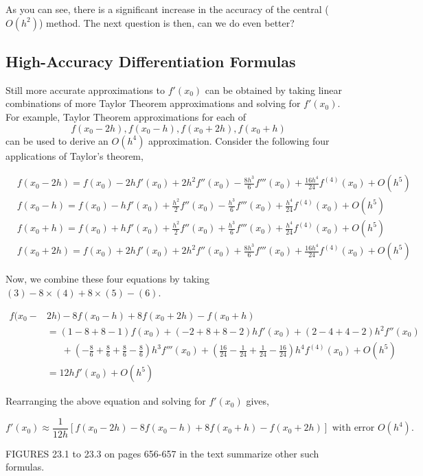 \documentclass [titlepage,12pt,letter] {article}
\begin{document}
As you can see, there is a significant increase in the accuracy of the central ($O(h^2)$) method. The next question is then, can we do even better?

\subsection{High-Accuracy Differentiation Formulas}

Still more accurate approximations to $f'(x_0)$ can be obtained by taking linear combinations of more Taylor Theorem approximations and solving for $f'(x_0)$.  For example, Taylor Theorem approximations for each of
\[
f(x_0-2h),f(x_0-h),f(x_0+2h),f(x_0+h)
\]
can be used to derive an $O(h^4)$ approximation. Consider the following four applications of Taylor's theorem,

\begin{align}
&f(x_0-2h)=f(x_0)-2hf'(x_0)+2h^2f''(x_0)-\frac{8h^3}{6}f'''(x_0)+\frac{16h^4}{24}f^{(4)}(x_0)+O(h^5) \\
&f(x_0-h)=f(x_0)-hf'(x_0)+\frac{h^2}{2}f''(x_0)-\frac{h^3}{6}f'''(x_0)+\frac{h^4}{24}f^{(4)}(x_0)+O(h^5) \\
&f(x_0+h)=f(x_0)+hf'(x_0)+\frac{h^2}{2}f''(x_0)+\frac{h^3}{6}f'''(x_0)+\frac{h^4}{24}f^{(4)}(x_0)+O(h^5) \\
&f(x_0+2h)=f(x_0)+2hf'(x_0)+2h^2f''(x_0)+\frac{8h^3}{6}f'''(x_0)+\frac{16h^4}{24}f^{(4)}(x_0)+O(h^5)
\end{align}

Now, we combine these four equations by taking $(3)-8\times(4)+8\times(5)-(6)$.

\begin{align*}
f(x_0-&2h)-8f(x_0-h)+8f(x_0+2h)-f(x_0+h) \\
&=(1-8+8-1)f(x_0) + (-2+8+8-2)hf'(x_0)+(2-4+4-2)h^2f''(x_0) \\
&~~~~~~~+(-\frac{8}{6}+\frac{8}{6}+\frac{8}{6}-\frac{8}{6})h^3f'''(x_0)+(\frac{16}{24}-\frac{1}{24}+\frac{1}{24}-\frac{16}{24})h^4f^{(4)}(x_0)+O(h^5)\\
&=12hf'(x_0)+O(h^5)
\end{align*}

Rearranging the above equation and solving for $f'(x_0)$ gives,

\[
\boxed{f'(x_0) \approx \frac{1}{12h} \left [f(x_0-2h)-8f(x_0-h)+8f(x_0+h)-f(x_0+2h) \right ]} \text{ with error } O(h^4).
\]

FIGURES 23.1 to 23.3 on pages 656-657 in the text summarize other such formulas.
\end{document}

